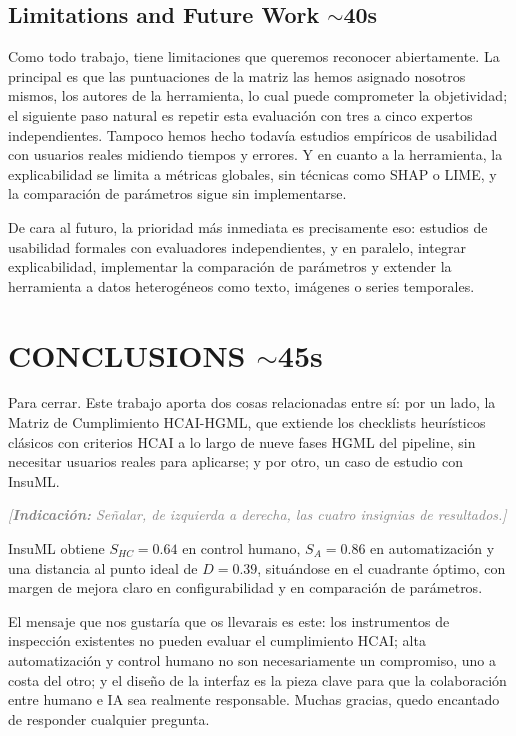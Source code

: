 \documentclass[11pt,a4paper]{article}
\newcommand{\indicacion}[1]{%
    \par\medskip
    \noindent\textcolor{gray}{\textit{[\textbf{Indicaci\'on:} #1]}}
    \par\medskip
}
\begin{document}
\subsection{Limitations and Future Work \hfill \normalfont\small $\sim$40s}
Como todo trabajo, tiene limitaciones que queremos reconocer abiertamente. La principal es que las puntuaciones de la matriz las hemos asignado nosotros mismos, los autores de la herramienta, lo cual puede comprometer la objetividad; el siguiente paso natural es repetir esta evaluación con tres a cinco expertos independientes. Tampoco hemos hecho todavía estudios empíricos de usabilidad con usuarios reales midiendo tiempos y errores. Y en cuanto a la herramienta, la explicabilidad se limita a métricas globales, sin técnicas como SHAP o LIME, y la comparación de parámetros sigue sin implementarse.

De cara al futuro, la prioridad más inmediata es precisamente eso: estudios de usabilidad formales con evaluadores independientes, y en paralelo, integrar explicabilidad, implementar la comparación de parámetros y extender la herramienta a datos heterogéneos como texto, imágenes o series temporales.

\section{CONCLUSIONS \hfill \normalfont\small $\sim$45s}
Para cerrar. Este trabajo aporta dos cosas relacionadas entre sí: por un lado, la Matriz de Cumplimiento HCAI-HGML, que extiende los checklists heurísticos clásicos con criterios HCAI a lo largo de nueve fases HGML del pipeline, sin necesitar usuarios reales para aplicarse; y por otro, un caso de estudio con InsuML.

\indicacion{Señalar, de izquierda a derecha, las cuatro insignias de resultados.}
InsuML obtiene $S_{HC} = 0.64$ en control humano, $S_A = 0.86$ en automatización y una distancia al punto ideal de $D = 0.39$, situándose en el cuadrante óptimo, con margen de mejora claro en configurabilidad y en comparación de parámetros.

El mensaje que nos gustaría que os llevarais es este: los instrumentos de inspección existentes no pueden evaluar el cumplimiento HCAI; alta automatización y control humano no son necesariamente un compromiso, uno a costa del otro; y el diseño de la interfaz es la pieza clave para que la colaboración entre humano e IA sea realmente responsable. Muchas gracias, quedo encantado de responder cualquier pregunta.
\end{document}
